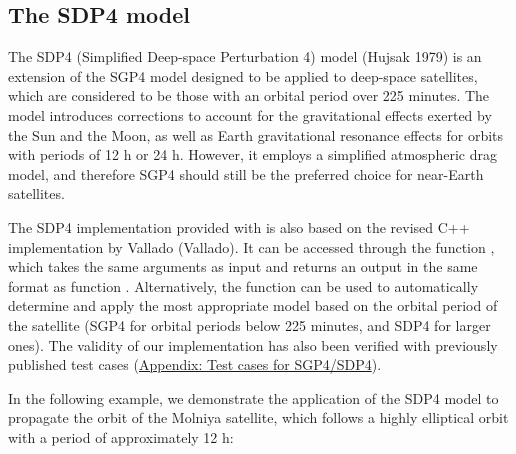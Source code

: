 \hypertarget{the-sdp4-model}{%
\subsection{The SDP4 model}\label{the-sdp4-model}}

The SDP4 (Simplified Deep-space Perturbation 4) model (Hujsak 1979) is an extension of the SGP4 model designed to be applied to deep-space satellites, which are considered to be those with an orbital period over 225 minutes. The model introduces corrections to account for the gravitational effects exerted by the Sun and the Moon, as well as Earth gravitational resonance effects for orbits with periods of 12 h or 24 h. However, it employs a simplified atmospheric drag model, and therefore SGP4 should still be the preferred choice for near-Earth satellites.

The SDP4 implementation provided with  is also based on the revised C++ implementation by Vallado (Vallado). It can be accessed through the function , which takes the same arguments as input and returns an output in the same format as function . Alternatively, the function  can be used to automatically determine and apply the most appropriate model based on the orbital period of the satellite (SGP4 for orbital periods below 225 minutes, and SDP4 for larger ones). The validity of our implementation has also been verified with previously published test cases (\protect\hyperlink{appendix-test-cases-for-sgp4sdp4}{Appendix: Test cases for SGP4/SDP4}).

In the following example, we demonstrate the application of the SDP4 model to propagate the orbit of the Molniya satellite, which follows a highly elliptical orbit with a period of approximately 12 h:

